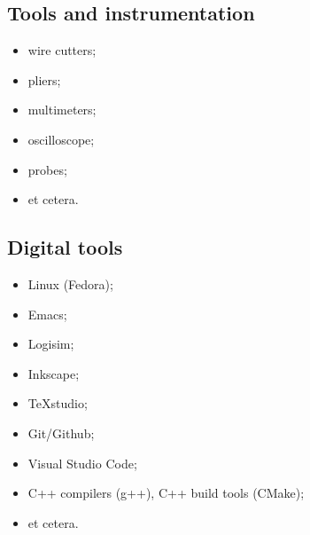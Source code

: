 \subsection{Tools and instrumentation}
\begin{itemize}
	\item wire cutters;
	\item pliers;
	\item multimeters;
	\item oscilloscope;
	\item probes;
	\item et cetera.
\end{itemize}

\subsection{Digital tools}
\begin{itemize}
	\item Linux (Fedora);
	\item Emacs;
	\item Logisim;
	\item Inkscape;
	\item TeXstudio;
	\item Git/Github;
	\item Visual Studio Code;
	\item C++ compilers (g++), C++ build tools (CMake);
	\item et cetera.
\end{itemize}